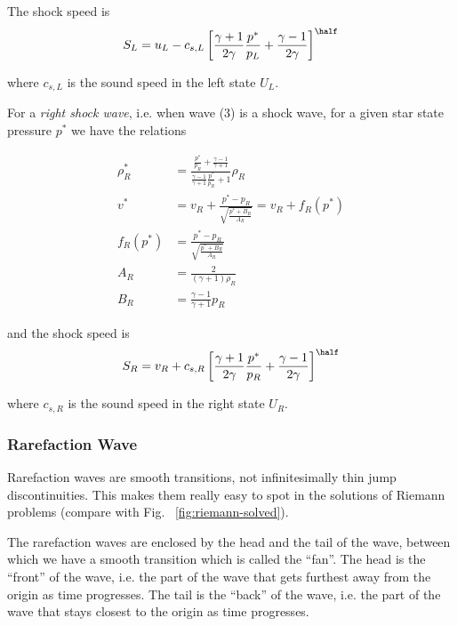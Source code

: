 The shock speed is
\begin{align}
	S_L = u_L - c_{s,L} \left[\frac{\gamma + 1}{2 \gamma} \frac{p^*}{p_L} + \frac{\gamma -
1}{2\gamma} \right]^{\half} \label{eq:shock-left-speed}
\end{align}

where $c_{s,L}$ is the sound speed in the left state $U_L$.



For a \emph{right shock wave}, i.e. when wave (3) is a shock wave, for a given star state
pressure $p^*$ we have the relations

\begin{align}
	\rho^*_R &=
		\frac{\frac{p^*}{p_R} + \frac{\gamma - 1}{\gamma+1}}{\frac{\gamma - 1}{\gamma+1}
\frac{p^*}{p_R} + 1} \rho_R \\
	v^* &=
		v_R + \frac{p^* - p_R}{\sqrt{\frac{p^* + B_R}{A_R}}}
		= v_R + f_R(p^*) \label{eq:velocity-shock-right} \\
    f_R(p^*) &=
        \frac{p^* - p_R}{\sqrt{\frac{p^* + B_R}{A_R}}} \\
	A_R &=
		\frac{2}{(\gamma + 1) \rho_R}\\
	B_R &=
		\frac{\gamma - 1}{\gamma + 1} p_R
\end{align}

and the shock speed is
\begin{align}
	S_R = v_R + c_{s,R} \left[\frac{\gamma + 1}{2 \gamma} \frac{p^*}{p_R} + \frac{\gamma -
1}{2\gamma} \right]^{\half} \label{eq:shock-right-speed}
\end{align}

where $c_{s,R}$ is the sound speed in the right state $U_R$.








\subsubsection{Rarefaction Wave}

Rarefaction waves are smooth transitions, not infinitesimally thin jump discontinuities.
This makes them really easy to spot in the solutions of Riemann problems (compare with Fig.~
\ref{fig:riemann-solved}).

The rarefaction waves are enclosed by the head and the tail of the wave, between which we have a
smooth transition which is called the ``fan''.
The head is the ``front'' of the wave, i.e. the part of the wave that gets furthest away from the
origin as time progresses.
The tail is the ``back'' of the wave, i.e. the part of the wave that stays closest to the origin as
time progresses.

